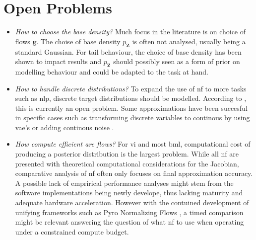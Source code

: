 \documentclass[12pt,fleqn,twocolumn]{article}
\begin{document}
\section*{Open Problems}%
\label{sec:Open Problems}
\begin{itemize}
    \item \emph{How to choose the base density?}
        Much focus in the literature is on choice of flows $\mathbf g$.
        The choise of base density $p_\mathbf Z$ is often not analysed, usually being a standard Gaussian.
        For tail behaviour, the choice of base density has been shown to impact results \cite{Jaini2019TailsOT} and $p_\mathbf Z$ should possibly seen as a form of prior on modelling behaviour \cite[Chap. 5.1.1]{koby2021nf} and could be adapted to the task at hand.
    \item \emph{How to handle discrete distributions?}
        To expand the use of \acrshort{nf} to more tasks such as \acrfull{nlp}, discrete target distributions should be modelled.
        According to \textcite{koby2021nf}, this is currently an open problem. 
        Some approximations have been succesful in specific cases such as transforming discrete variables to continous by using \acrshort{vae}'s or adding continous noise \cite[Chap. 5.2.2]{koby2021nf}.
    \item \emph{How compute efficient are flows?}
        For \acrshort{vi} and most \acrshort{bml}, computational cost of producing a posterior distribution is the largest problem.
        While all \acrshort{nf} are presented with theoretical computational considerations for the Jacobian, comparative analysis of \acrshort{nf} often only focuses on final approximation accuracy.
        A possible lack of emprirical performance analyses might stem from the software implementations being newly develope, thus lacking maturity and adequate hardware acceleration.
        However with the contuined development of unifying frameworks such as Pyro Normalizing Flows \cite{bingham2018pyro}, a timed comparison might be relevant answering the question of what \acrshort{nf} to use when operating under a constrained compute budget.
\end{itemize}

\clearpage
\renewcommand*{\bibfont}{\normalfont\footnotesize}
\printbibliography[heading=bibintoc]

\printglossary[type=\acronymtype]
\end{document}
